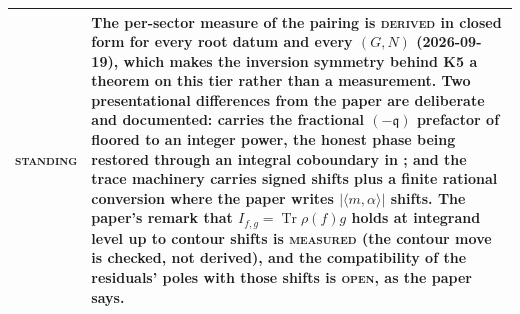 \documentclass[11pt]{amsart}
\makeatletter
\DeclareMathOperator{\Tr}{Tr}
\newcommand\fq{\mathfrak{q}}
\theoremstyle{remark}
\newcommand{\peqref}[1]{\@ifundefined{r@P-#1}{\textup{[\texttt{\detokenize{#1}}]}}{\eqref{P-#1}}}
\newcommand{\DERIVED}{\textsc{derived}}
\newcommand{\MEASURED}{\textsc{measured}}
\newcommand{\OPEN}{\textsc{open}}
\newenvironment{machinery}{%
  \leavevmode\par\medskip\noindent
  \begin{tabular}{@{}>{\scshape}p{2.1cm}>{\raggedright\arraybackslash}p{\dimexpr\linewidth-2.5cm\relax}@{}}\toprule}%
  {\bottomrule\end{tabular}\par\medskip}
\makeatother
\begin{document}
\begin{machinery}
standing & The per-sector measure of the pairing is \DERIVED{} in closed form for every root datum and every $(G,N)$ (2026-09-19), which makes the inversion symmetry behind K5 a theorem on this tier rather than a measurement.  Two presentational differences from the paper are deliberate and documented: \code{dressing_psi} carries the fractional $(-\fq)$ prefactor of \peqref{eq:cocha} floored to an integer power, the honest phase being restored through an integral coboundary in \code{cocycle_R}; and the trace machinery carries signed shifts plus a finite rational conversion where the paper writes $|\langle m,\alpha\rangle|$ shifts.  The paper's remark that $I_{f,g}=\Tr\rho(f)g$ holds at integrand level up to contour shifts is \MEASURED{} (the contour move is checked, not derived), and the compatibility of the residuals' poles with those shifts is \OPEN{}, as the paper says. \\
\end{machinery}
\end{document}
